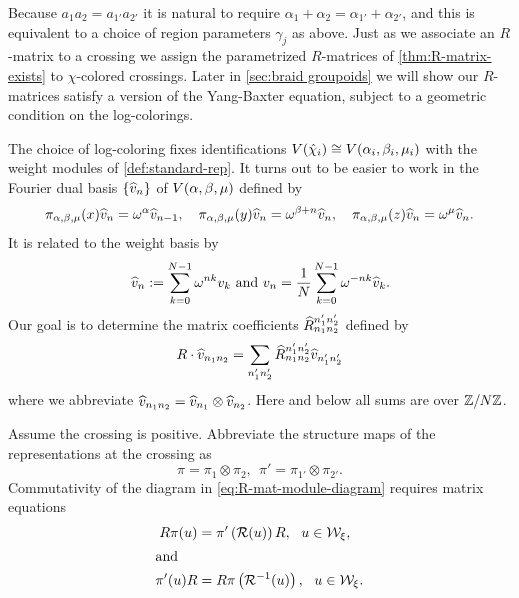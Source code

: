 \documentclass{sl2ams}
\numberwithin{equation}{section}
\newcommand{\ZZ}{\mathbb{Z}}
\newcommand{\W}{\mathcal{W}}
\newcommand{\R}{\mathcal{R}}
\begin{document}
Because \(a_1 a_2 = a_{1'} a_{2'}\) it is natural to require \(\alpha_1 + \alpha_2 = \alpha_{1'} + \alpha_{2'}\), and this is equivalent to a choice of region parameters \(\gamma_j\) as above.
Just as we associate an \(R\)-matrix to a crossing we assign the parametrized \(R\)-matrices of \cref{thm:R-matrix-exists} to \(\chi\)-colored crossings.
Later in \cref{sec:braid groupoids} we will show our \(R\)-matrices satisfy a version of the Yang-Baxter equation, subject to a geometric condition on the log-colorings.

The choice of log-coloring fixes identifications \(V\mathopen{}\left(\hat \chi_{i}\right) \cong V\mathopen{}\left(\alpha_{i}, \beta_{i}, \mu_{i}\right)\) with the weight modules of \cref{def:standard-rep}.
It turns out to be easier to work in the Fourier dual basis \(\set{\vbh{n}}\) of \(V\mathopen{}\left(\alpha, \beta, \mu\right)\) defined by 
\begin{equation}
  \label{eq:non-weight-basis}
  \pi_{\alpha, \beta, \mu}(x) \widehat{v}_{n} = \omega^{\alpha} \widehat{v}_{n-1},
  \quad
  \pi_{\alpha, \beta, \mu}(y) \widehat{v}_{n} = \omega^{\beta + n} \widehat{v}_{n},
  \quad
  \pi_{\alpha, \beta, \mu}(z) \widehat{v}_{n} = \omega^{\mu} \widehat{v}_{n}.
\end{equation}
It is related to the weight basis by
\begin{equation}
  \label{eq:basis-and-dual-basis}
  \widehat{v}_{n} \mathrel{:=} \sum^{N-1}_{k=0} \omega^{nk} v_{k}
  \text{ and }
  v_{n} = \frac{1}{N} \sum_{k=0}^{N-1} \omega^{-n k} \widehat{v}_{k}
  .
\end{equation}
Our goal is to determine the matrix coefficients \(\rmat{n_1}{ n_2}{n_1'}{n_2'}\) defined by 
\begin{equation}
  \label{eq:R-matrix-coefficients}
  R \cdot \vbh{n_1 n_2} = \sum_{n_1' n_2'} \rmat{n_1}{ n_2}{n_1'}{n_2'} \vbh{n_1' n_2'}
\end{equation}
where we abbreviate $\widehat{v}_{n_1 n_2} = \widehat{v}_{n_1} \otimes \widehat{v}_{n_2}$.
Here and below all sums are over $\ZZ/\nr\ZZ$.

Assume the crossing is positive.
Abbreviate the structure maps of the representations at the crossing as
\[
  \pi = \pi_1 \otimes \pi_2, \ \ \pi' = \pi_{1'} \otimes \pi_{2'}.
\]
Commutativity of the diagram in \eqref{eq:R-mat-module-diagram} requires matrix equations
\begin{align}
  \label{eq:intertwiner-rel}
  R \pi(u) &=  \pi'\left(\R(u)\right) R, \ \ u \in \W_\xi, \\
  \intertext{and}
  \label{eq:intertwiner-rel-inv}
  \pi'(u) R &= R \pi\left(\R^{-1}(u)\right), \ \ u \in \W_\xi.
\end{align}
\end{document}

